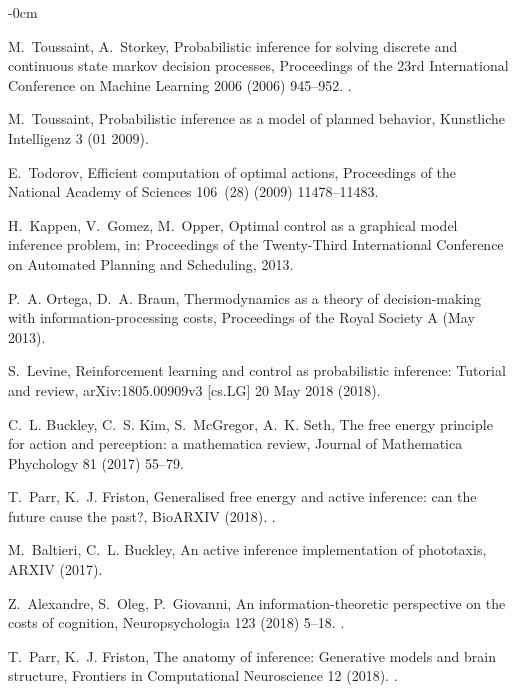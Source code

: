 \documentclass[journal,article,submit,pdftex,moreauthors]{Definitions/mdpi}
\begin{document}
\begin{adjustwidth}{-\extralength}{0cm}
\begin{thebibliography}{10}
	M.~Toussaint, A.~Storkey, Probabilistic inference for solving discrete and
	  continuous state markov decision processes, Proceedings of the 23rd
	  International Conference on Machine Learning 2006 (2006) 945--952.
	\newblock \href {https://doi.org/10.1145/1143844.1143963}
	  {}.
	
	M.~Toussaint, Probabilistic inference as a model of planned behavior,
	  Kunstliche Intelligenz 3 (01 2009).
	
	E.~Todorov, Efficient computation of optimal actions, Proceedings of the
	  National Academy of Sciences 106~(28) (2009) 11478--11483.
	
	H.~Kappen, V.~Gomez, M.~Opper, Optimal control as a graphical model inference
	  problem, in: Proceedings of the Twenty-Third International Conference on
	  Automated Planning and Scheduling, 2013.
	
	P.~A. Ortega, D.~A. Braun, Thermodynamics as a theory of decision-making with
	  information-processing costs, Proceedings of the Royal Society A (May 2013).
	
	S.~Levine, Reinforcement learning and control as probabilistic inference:
	  Tutorial and review, arXiv:1805.00909v3 [cs.LG] 20 May 2018 (2018).
	
	C.~L. Buckley, C.~S. Kim, S.~McGregor, A.~K. Seth, The free energy principle
	  for action and perception: a mathematica review, Journal of Mathematica
	  Phychology 81 (2017) 55--79.
	
	T.~Parr, K.~J. Friston, Generalised free energy and active inference: can the
	  future cause the past?, BioARXIV (2018).
	\newblock \href {https://doi.org/10.1101/304782} {}.
	
	M.~Baltieri, C.~L. Buckley, An active inference implementation of phototaxis,
	  ARXIV (2017).
	
	Z.~Alexandre, S.~Oleg, P.~Giovanni, An information-theoretic perspective on the
	  costs of cognition, Neuropsychologia 123 (2018) 5--18.
	\newblock \href {https://doi.org/10.1016/j.neuropsychologia.2018.09.013}
	  {}.
	
	T.~Parr, K.~J. Friston, The anatomy of inference: Generative models and brain
	  structure, Frontiers in Computational Neuroscience 12 (2018).
	\newblock \href {https://doi.org/10.3389/fncom.2018.00090}
	  {}.
	

\end{thebibliography}
\end{adjustwidth}
\end{document}
